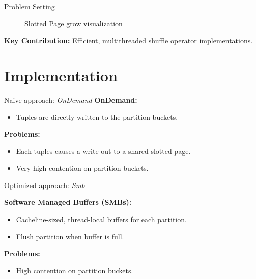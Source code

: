 \begin{frame}{Problem Setting}
\begin{figure}[h]
{}
    \centering
    \caption{Slotted Page grow visualization}
  \end{figure}

  \vspace{-0.5em}\textbf{Key Contribution:}
  Efficient, multithreaded shuffle operator implementations.
\end{frame}

\section{Implementation}
\begin{frame}{Naive approach: \emph{OnDemand}}
  \textbf{OnDemand:}
  \begin{itemize}
    \vspace{-1.5em}
    \item Tuples are directly written to the partition buckets.
  \end{itemize}
  \textbf{Problems:}
  \begin{itemize}
    \vspace{-1.5em}
    \item Each tuples causes a write-out to a shared slotted page.
    \item Very high contention on partition buckets.
  \end{itemize}
  \pause
  {\PraesentationSchriftgroesseSehrGross\selectfont Optimized approach: \emph{Smb}}

  \textbf{Software Managed Buffers (SMBs):}
  \begin{itemize}
    \vspace{-1.5em}
    \item Cacheline-sized, thread-local buffers for each partition.
    \item Flush partition when buffer is full.
  \end{itemize}
  \textbf{Problems:}
  \begin{itemize}
    \vspace{-1.5em}
    \item High contention on partition buckets.
  \end{itemize}
\end{frame}

